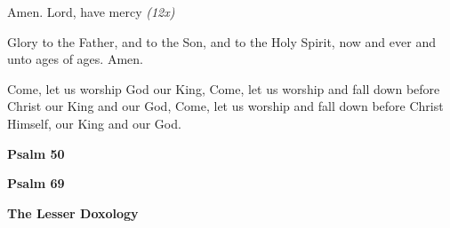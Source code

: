 \begin{hang}
\noindent{}Amen.  Lord, have mercy \textit{(12x)}

Glory to the Father, and to the Son, and to the Holy Spirit, now and ever and unto ages of ages. Amen.

Come, let us worship God our King, Come, let us worship and fall down before Christ our King and our God, Come, let us worship and fall down before Christ Himself, our King and our God.

\end{hang}

\begin{center}
\textbf{Psalm 50}
\end{center}

\begin{hang}


\end{hang}

\newpage
\begin{center}
\textbf{Psalm 69}
\end{center}

\begin{hang}


\end{hang}

\begin{center}
\textbf{The Lesser Doxology}
\end{center}

